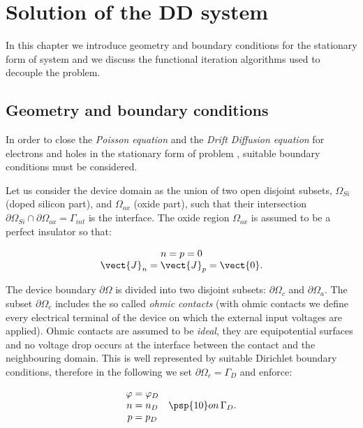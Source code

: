 \chapter{Solution of the DD system}

In this chapter we introduce geometry and boundary conditions for the stationary form of system  and we discuss the functional iteration algorithms used to decouple the problem.

\section{Geometry and boundary conditions}

In order to close the \textit{Poisson equation} and the \textit{Drift Diffusion equation} for electrons and holes in the stationary form of problem , suitable boundary conditions must be considered.

Let us consider the device domain as the union of two open disjoint subsets, $\Omega_{Si}$ (doped silicon part), and $\Omega_{ox}$ (oxide part), such that their intersection $\partial \Omega_{Si} \cap \partial \Omega_{ox} = \Gamma_{int}$ is the interface. The oxide region $\Omega_{ox}$ is assumed to be a perfect insulator so that:

\begin{equation}
\label{eq: hypotesis oxide}
\begin{array}{c}
n = p = 0 \\
\vect{J}_n = \vect{J}_p = \vect{0}.
\end{array}
\end{equation}

The device boundary $\partial \Omega$ is divided into two disjoint subsets: $\partial \Omega_{c}$ and $\partial \Omega_{a}$.
The subset $\partial \Omega_{c}$ includes the so called \textit{ohmic contacts} (with ohmic contacts we define every electrical terminal of the device on which the external input voltages are applied). Ohmic contacts are assumed to be \textit{ideal}, they are equipotential surfaces and no voltage drop occurs at the interface between the contact and the neighbouring domain. This is well represented by suitable Dirichlet boundary conditions, therefore in the following we set $\partial \Omega_{c} = \Gamma_D$ and enforce:

\begin{equation}
\label{eq: dirichlet boundary condition}
\begin{array}{cc}
\varphi = \varphi_D & \\
n = n_D & \psp{10} on \, \Gamma_D .\\
p = p_D & 
\end{array}
\end{equation}

